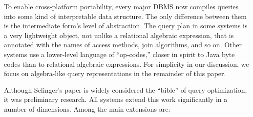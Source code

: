 \documentclass[a4paper,11pt,twoside,openright]{book}
\begin{document}
To enable cross-platform portability, every major DBMS now compiles
queries into some kind of interpretable data structure. The only
difference between them is the intermediate form's level of abstraction.
The query plan in some systems is a very lightweight object, not unlike
a relational algebraic expression, that is annotated with the names of
access methods, join algorithms, and so on. Other systems use a
lower-level language of ``op-codes,'' closer in spirit to Java byte
codes than to relational algebraic expressions. For simplicity in our
discussion, we focus on algebra-like query representations in the
remainder of this paper.

Although Selinger's paper is widely considered the ``bible'' of query
optimization, it was preliminary research. All systems extend this work
significantly in a number of dimensions. Among the main extensions are:
\end{document}
